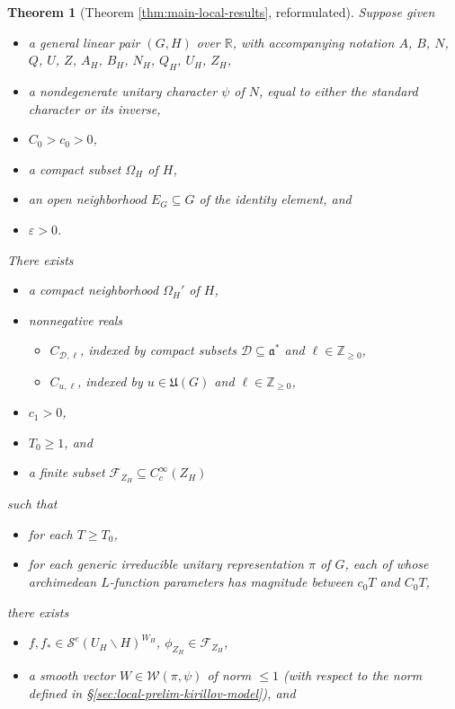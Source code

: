 \documentclass[reqno]{amsart}
\def\eps{\varepsilon}
\theoremstyle{plain} \newtheorem{theorem} {Theorem}
\theoremstyle{definition} \newtheorem{definition} [theorem] {Definition}
\theoremstyle{itplain} %
\numberwithin{equation}{section}
\numberwithin{theorem}{section}
\renewcommand{\geq}{\geqslant}
\renewcommand{\leq}{\leqslant}
\begin{document}
\begin{theorem}[Theorem \ref{thm:main-local-results}, reformulated]\label{thm:construction-vectors-original}
  Suppose given
\begin{itemize}
\item a general linear pair $(G,H)$ over $\mathbb{R}$, with accompanying notation $A$, $B$, $N$, $Q$, $U$, $Z$, $A_H$, $B_H$, $N_H$, $Q_H$, $U_H$, $Z_H$,
\item a nondegenerate unitary character $\psi$ of $N$, equal to either the standard character or its inverse,
\item $C_0 > c_0 > 0$,
\item a compact subset $\Omega_H$ of $H$,
\item an open neighborhood $E_G \subseteq G$ of the identity element, and
\item $\eps > 0$.
\end{itemize}
There exists
\begin{itemize}
\item a compact neighborhood $\Omega_H '$ of $H$,
\item nonnegative reals
  \begin{itemize}
  \item $C_{\mathcal{D},\ell}$, indexed by compact subsets $\mathcal{D} \subseteq \mathfrak{a}^*$ and $\ell \in \mathbb{Z}_{\geq 0}$,
  \item $C_{u, \ell}$, indexed by $u \in \mathfrak{U}(G)$ and $\ell \in \mathbb{Z}_{\geq 0}$,
  \end{itemize}
\item $c_1 > 0$,
\item $T_0 \geq 1$, and
\item a finite subset $\mathcal{F}_{Z_H} \subseteq C_c^\infty(Z_H)$
\end{itemize}
such that
\begin{itemize}
\item for each $T \geq T_0$,
\item for each generic irreducible unitary representation $\pi$ of $G$, each of whose archimedean $L$-function parameters has magnitude between $c_0 T$ and $C_0 T$,
\end{itemize}
there exists
\begin{itemize}
\item $f, f_{\ast} \in \mathcal{S}^e(U_H \backslash H)^{W_H}$, $\phi_{Z_H} \in \mathcal{F}_{Z_H}$,
\item a smooth vector $W \in \mathcal{W}(\pi,\psi)$ of norm $\leq 1$ (with respect to the norm defined in \S\ref{sec:local-prelim-kirillov-model}), and

\end{itemize}
\end{theorem}
\end{document}
